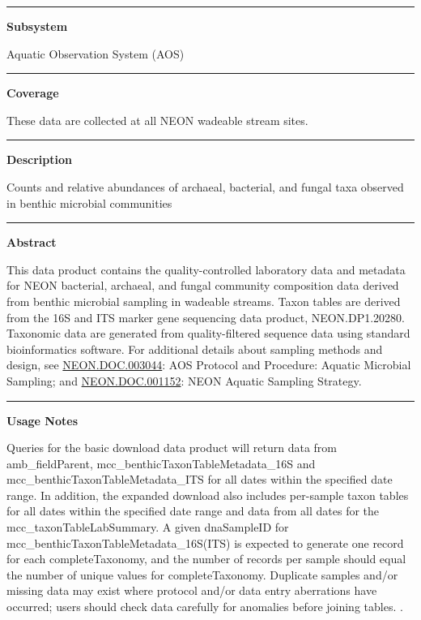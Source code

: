 \documentclass[]{article}
\begin{document}
\begin{center}\rule{0.5\linewidth}{\linethickness}\end{center}

\textbf{Subsystem}

Aquatic Observation System (AOS)

\begin{center}\rule{0.5\linewidth}{\linethickness}\end{center}

\textbf{Coverage}

These data are collected at all NEON wadeable stream sites.

\begin{center}\rule{0.5\linewidth}{\linethickness}\end{center}

\textbf{Description}

Counts and relative abundances of archaeal, bacterial, and fungal taxa
observed in benthic microbial communities

\begin{center}\rule{0.5\linewidth}{\linethickness}\end{center}

\textbf{Abstract}

This data product contains the quality-controlled laboratory data and
metadata for NEON bacterial, archaeal, and fungal community composition
data derived from benthic microbial sampling in wadeable streams. Taxon
tables are derived from the 16S and ITS marker gene sequencing data
product, NEON.DP1.20280. Taxonomic data are generated from
quality-filtered sequence data using standard bioinformatics software.
For additional details about sampling methods and design, see
\href{http://data.neonscience.org/api/v0/documents/NEON.DOC.003044vB}{NEON.DOC.003044}:
AOS Protocol and Procedure: Aquatic Microbial Sampling; and
\href{http://data.neonscience.org/api/v0/documents/NEON.DOC.001152vA}{NEON.DOC.001152}:
NEON Aquatic Sampling Strategy.

\begin{center}\rule{0.5\linewidth}{\linethickness}\end{center}

\textbf{Usage Notes}

Queries for the basic download data product will return data from
amb\_fieldParent, mcc\_benthicTaxonTableMetadata\_16S and
mcc\_benthicTaxonTableMetadata\_ITS for all dates within the specified
date range. In addition, the expanded download also includes per-sample
taxon tables for all dates within the specified date range and data from
all dates for the mcc\_taxonTableLabSummary. A given dnaSampleID for
mcc\_benthicTaxonTableMetadata\_16S(ITS) is expected to generate one
record for each completeTaxonomy, and the number of records per sample
should equal the number of unique values for completeTaxonomy. Duplicate
samples and/or missing data may exist where protocol and/or data entry
aberrations have occurred; users should check data carefully for
anomalies before joining tables. \newpage
.
\end{document}
